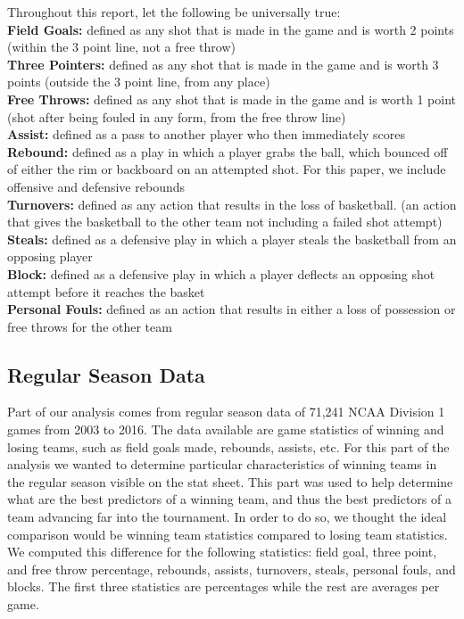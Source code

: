 \documentclass[]{scrartcl}
\begin{document}
\noindent
Throughout this report, let the following be universally true:\\
{\textbf {Field Goals:}} defined as any shot that is made in the game and is worth 2 points (within the 3 point line, not a free throw)\\
{\textbf {Three Pointers:}} defined as any shot that is made in the game and is worth 3 points (outside the 3 point line, from any place)\\
{\textbf {Free Throws:}} defined as any shot that is made in the game and is worth 1 point (shot after being fouled in any form, from the free throw line)\\
{\textbf {Assist:}} defined as a pass to another player who then immediately scores\\
{\textbf {Rebound:}} defined as a play in which a player grabs the ball, which bounced off of either the rim or backboard on an attempted shot. For this paper, we include offensive and defensive rebounds\\
{\textbf {Turnovers:}} defined as any action that results in the loss of basketball. (an action that gives the basketball to the other team not including a failed shot attempt)\\
{\textbf {Steals:}} defined as a defensive play in which a player steals the basketball from an opposing player\\
{\textbf {Block:}} defined as a defensive play in which a player deflects an opposing shot attempt before it reaches the basket\\
{\textbf {Personal Fouls:}} defined as an action that results in either a loss of possession or free throws for the other team\\
\subsection*{Regular Season Data}
Part of our analysis comes from regular season data of 71,241 NCAA Division 1 games from 2003 to 2016. The data available are game statistics of winning and losing teams, such as field goals made, rebounds, assists, etc. For this part of the analysis we wanted to determine particular characteristics of winning teams in the regular season visible on the stat sheet. This part was used to help determine what are the best predictors of a winning team, and thus the best predictors of a team advancing far into the tournament. In order to do so, we thought the ideal comparison would be winning team statistics compared to losing team statistics. We computed this difference for the following statistics: field goal, three point, and free throw percentage, rebounds, assists, turnovers, steals, personal fouls, and blocks. The first three statistics are percentages while the rest are averages per game.
\end{document}
